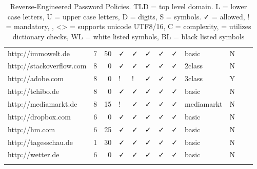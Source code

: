 {\begin{longtable}{lrrlllllllp{1cm}p{1cm}}
		http://immowelt.de & 7     & 50    & ✓ & ✓ & ✓ & ✓ & ✓ & basic & N     &       &  \\
		http://stackoverflow.com & 8     & 0     & ✓ & ✓ & ✓ & ✓ & ✓ & 2class & N     &       &  \\
		http://adobe.com & 8     & 0     & ! & ! & ✓ & ✓ & ✓ & 3class & Y     &       &  \\
		http://tchibo.de & 8     & 0     & ✓ & ✓ & ✓ & ✓ & ✓ & basic & N     &       &  \\
		http://mediamarkt.de & 8     & 15    & ! & ✓ & ✓ & ✓ & ✓ & mediamarkt & N     &       &  \\
		http://dropbox.com & 6     & 0     & ✓ & ✓ & ✓ & ✓ & ✓ & basic & N     &       &  \\
		http://hm.com & 6     & 25    & ✓ & ✓ & ✓ & ✓ & ✓ & basic & N     &       &  \\
		http://tagesschau.de & 1     & 30    & ✓ & ✓ & ✓ & ✓ & ✓ & basic & N     &       &  \\
		http://wetter.de & 6     & 0     & ✓ & ✓ & ✓ & ✓ & ✓ & basic & N     &       &  \\
		\caption{\label{tab:appendix:policies} Reverse-Engineered Password Policies. TLD = top level domain. L = lower case letters, U = upper case letters, D = digits, S = symbols. ✓ = allowed, ! = mandatory, , <> = supports unicode UTF8/16, C = complexity, \emoji{1F4D6} = utilizes dictionary checks, WL = white listed symbols, BL = black listed symbols}
\end{longtable}%
}%